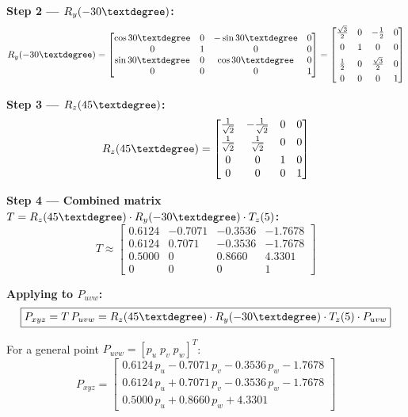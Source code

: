 \documentclass[12pt,a3paper]{article}
\begin{document}
\begin{enumerate}
\begin{tcolorbox}[enhanced,breakable,ansbox,colback=cB!4,colframe=cB,
  boxrule=0.8pt,arc=5pt,
  title={\textbf{Answer}},fonttitle=\bfseries\color{white},
  colbacktitle=cB]
\textbf{Step 2 — $R_y(-30\textdegree)$:}
\[
  R_y(-30\textdegree) =
  \begin{bmatrix}
    \cos30\textdegree  & 0 & -\sin30\textdegree & 0 \\
    0              & 1 &  0             & 0 \\
    \sin30\textdegree  & 0 &  \cos30\textdegree & 0 \\
    0              & 0 &  0             & 1
  \end{bmatrix}
  =
  \begin{bmatrix}
    \frac{\sqrt{3}}{2} & 0 & -\frac{1}{2} & 0 \\[4pt]
    0                  & 1 &  0           & 0 \\[4pt]
    \frac{1}{2}        & 0 &  \frac{\sqrt{3}}{2} & 0 \\[4pt]
    0                  & 0 &  0           & 1
  \end{bmatrix}
\]

\textbf{Step 3 — $R_z(45\textdegree)$:}
\[
  R_z(45\textdegree) =
  \begin{bmatrix}
    \frac{1}{\sqrt{2}} & -\frac{1}{\sqrt{2}} & 0 & 0 \\[4pt]
    \frac{1}{\sqrt{2}} &  \frac{1}{\sqrt{2}} & 0 & 0 \\[4pt]
    0                  &  0                  & 1 & 0 \\
    0                  &  0                  & 0 & 1
  \end{bmatrix}
\]

\textbf{Step 4 — Combined matrix $T = R_z(45\textdegree)\cdot R_y(-30\textdegree)\cdot T_z(5)$:}
\[
  T \approx
  \begin{bmatrix}
     0.6124 & -0.7071 & -0.3536 & -1.7678 \\[4pt]
     0.6124 &  0.7071 & -0.3536 & -1.7678 \\[4pt]
     0.5000 &  0      &  0.8660 &  4.3301 \\[4pt]
     0      &  0      &  0      &  1
  \end{bmatrix}
\]

\textbf{Applying to $P_{uvw}$:}
\[
  \boxed{P_{xyz} = T\,P_{uvw}
  = R_z(45\textdegree)\cdot R_y(-30\textdegree)\cdot T_z(5)\cdot P_{uvw}}
\]

For a general point $P_{uvw} = [p_u\;p_v\;p_w]^T$:
\[
  P_{xyz} =
  \begin{bmatrix}
    0.6124\,p_u - 0.7071\,p_v - 0.3536\,p_w - 1.7678 \\[4pt]
    0.6124\,p_u + 0.7071\,p_v - 0.3536\,p_w - 1.7678 \\[4pt]
    0.5000\,p_u + 0.8660\,p_w + 4.3301
  \end{bmatrix}
\]


\end{tcolorbox}
\end{enumerate}
\end{document}
